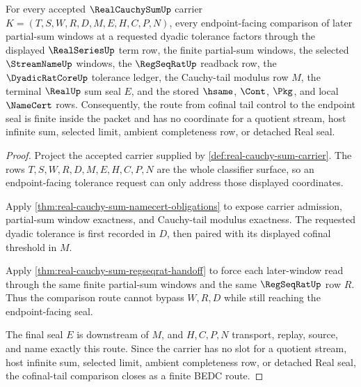 \begin{theorem}\label{thm:real-cauchy-sum-cofinal-tail-closure}
For every accepted $\RealCauchySumUp$ carrier $K=(T,S,W,R,D,M,E,H,C,P,N)$, every endpoint-facing comparison of later partial-sum windows at a requested dyadic tolerance factors through the displayed $\RealSeriesUp$ term row, the finite partial-sum windows, the selected $\StreamNameUp$ windows, the $\RegSeqRatUp$ readback row, the $\DyadicRatCoreUp$ tolerance ledger, the Cauchy-tail modulus row $M$, the terminal $\RealUp$ sum seal $E$, and the stored $\hsame$, $\Cont$, $\Pkg$, and local $\NameCert$ rows. Consequently, the route from cofinal tail control to the endpoint seal is finite inside the packet and has no coordinate for a quotient stream, host infinite sum, selected limit, ambient completeness row, or detached Real seal.
\end{theorem}
\begin{proof}
Project the accepted carrier supplied by \autoref{def:real-cauchy-sum-carrier}. The rows $T,S,W,R,D,M,E,H,C,P,N$ are the whole classifier surface, so an endpoint-facing tolerance request can only address those displayed coordinates.

Apply \autoref{thm:real-cauchy-sum-namecert-obligations} to expose carrier admission, partial-sum window exactness, and Cauchy-tail modulus exactness. The requested dyadic tolerance is first recorded in $D$, then paired with its displayed cofinal threshold in $M$.

Apply \autoref{thm:real-cauchy-sum-regseqrat-handoff} to force each later-window read through the same finite partial-sum windows and the same $\RegSeqRatUp$ row $R$. Thus the comparison route cannot bypass $W,R,D$ while still reaching the endpoint-facing seal.

The final seal $E$ is downstream of $M$, and $H,C,P,N$ transport, replay, source, and name exactly this route. Since the carrier has no slot for a quotient stream, host infinite sum, selected limit, ambient completeness row, or detached Real seal, the cofinal-tail comparison closes as a finite BEDC route.
\end{proof}


